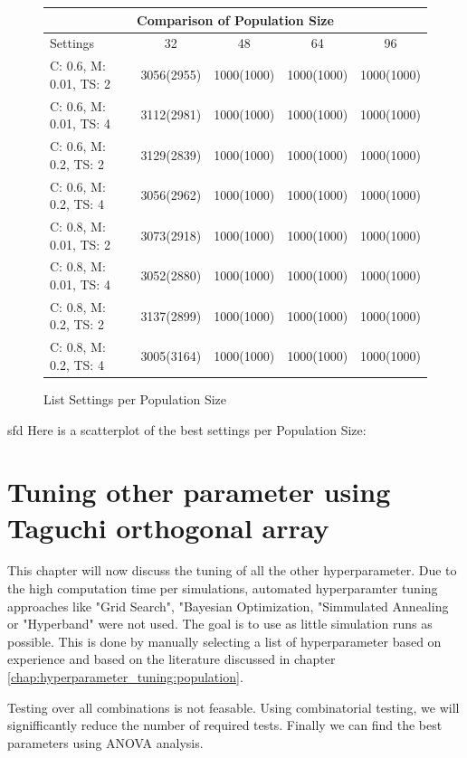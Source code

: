 \begin{figure}[!h]
	\centering
\begin{tabular}{ |l||c|c|c|c|  }
	\hline
	\multicolumn{5}{|c|}{ Comparison of Population Size} \\
	\hline
	Settings & 32 & 48 & 64 & 96\\
	\hline
	C: 0.6, M: 0.01, TS: 2   	& 3056(2955) & 1000(1000) & 1000(1000) & 1000(1000)\\
	C: 0.6, M: 0.01, TS: 4		& 3112(2981) & 1000(1000) & 1000(1000) & 1000(1000)\\
	C: 0.6, M: 0.2, TS: 2 		& 3129(2839) & 1000(1000) & 1000(1000) & 1000(1000)\\
	C: 0.6, M: 0.2, TS: 4    	& 3056(2962) & 1000(1000) & 1000(1000) & 1000(1000)\\
	C: 0.8, M: 0.01, TS: 2   	& 3073(2918) & 1000(1000) & 1000(1000) & 1000(1000)\\
	C: 0.8, M: 0.01, TS: 4		& 3052(2880) & 1000(1000) & 1000(1000) & 1000(1000)\\
	C: 0.8, M: 0.2, TS: 2 		& 3137(2899) & 1000(1000) & 1000(1000) & 1000(1000)\\
	C: 0.8, M: 0.2, TS: 4    	& 3005(3164) & 1000(1000) & 1000(1000) & 1000(1000)\\
	\hline
\end{tabular}
\caption{List Settings per Population Size}
\end{figure}
sfd
Here is a scatterplot of the best settings per Population Size:


\section{Tuning other parameter using Taguchi orthogonal array}
\label{chap:hyperparameter_tuning:other_parameter}

This chapter will now discuss the tuning of all the other hyperparameter. 
Due to the high computation time per simulations, automated hyperparamter tuning approaches like "Grid Search", "Bayesian Optimization, "Simmulated Annealing or "Hyperband" were not used. 
The goal is to use as little simulation runs as possible. This is done by manually selecting a list of hyperparameter based on experience and based on the literature discussed in chapter \ref{chap:hyperparameter_tuning:population}. 

Testing over all combinations is not feasable. Using combinatorial testing, we will signifficantly reduce the number of required tests. Finally we can find the best parameters using ANOVA analysis.


